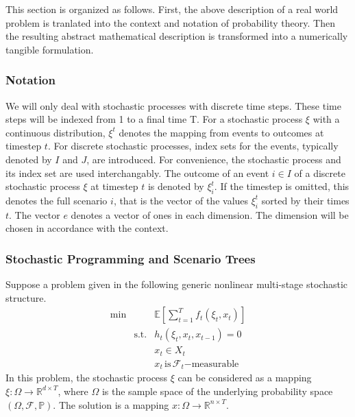 \documentclass[a4paper, 12pt] {article}
\begin{document}
This section is organized as follows. First, the above description of a real world problem is tranlated into the context and notation of probability theory. Then the resulting abstract mathematical description is transformed into a numerically tangible formulation.
\subsubsection{Notation}
We will only deal with stochastic processes with discrete time steps. These time steps will be indexed from 1 to a final time T. For a stochastic process $\xi$ with a continuous distribution, $\xi^t$ denotes the mapping from events to outcomes at timestep $t$. For discrete stochastic processes, index sets for the events, typically denoted by $I$ and $J$, are introduced. For convenience, the stochastic process and its index set are used interchangably. The outcome of an event $i\in I$ of a discrete stochastic process $\xi$ at timestep $t$ is denoted by $\xi_i^t$. If the timestep is omitted, this denotes the full scenario $i$, that is the vector of the values $\xi_i^t$ sorted by their times $t$.
The vector $e$ denotes a vector of ones in each dimension. The dimension will be chosen in accordance with the context. 
\subsubsection{Stochastic Programming and Scenario Trees}
Suppose a problem given in the following generic nonlinear multi-stage stochastic structure. 
\begin{eqnarray}
  \label{eq:genericSP}
  \min &&\mathbb{E}\left[\sum_{t=1}^Tf_t(\xi_t, x_t)\right]\\
  &\mathrm{s.t.}& h_t(\xi_t, x_t, x_{t-1}) = 0\\
  &&x_t \in X_t\\
  &&x_t \, \mathrm{is}\,\mathcal{F}_t \mathrm{-measurable} \label{eqn:measurability-constraint}
\end{eqnarray}
In this problem, the stochastic process $\xi$ can be considered as a mapping $\xi:\Omega\rightarrow \mathbb{R}^{d\times T}$, where $\Omega$ is the sample space of the underlying probability space $(\Omega, \mathcal{F}, \mathbb{P})$. The solution is a mapping $x:\Omega\rightarrow \mathbb{R}^{n\times T}$.
 
\end{document}
